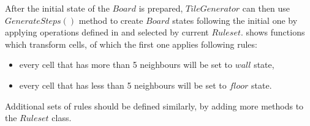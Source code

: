 \documentclass[12pt]{report}
\begin{document}


After the initial state of the $Board$ is prepared, $TileGenerator$ can then use $GenerateSteps()$ method to create $Board$ states following the initial one by applying operations defined in and selected by current $Ruleset$.  shows functions which transform cells, of which the first one applies following rules:

\begin{itemize}
	\item every cell that has more than 5 neighbours will be set to $wall$ state, 
	\item every cell that has less than 5 neighbours will be set to $floor$ state. 
\end{itemize}

Additional sets of rules should be defined similarly, by adding more methods to the $Ruleset$ class. 
\end{document}
